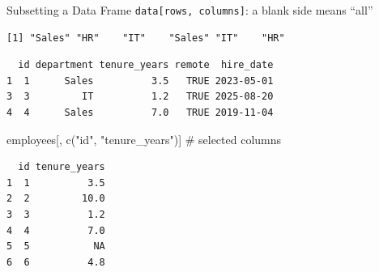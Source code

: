 \documentclass[
  ignorenonframetext,
  aspectratio=169,
]{beamer}
\newenvironment{Shaded}{\begin{snugshade}}{\end{snugshade}}
\newcommand{\CommentTok}[1]{\textcolor[rgb]{0.37,0.37,0.37}{#1}}
\newcommand{\FunctionTok}[1]{\textcolor[rgb]{0.28,0.35,0.67}{#1}}
\newcommand{\NormalTok}[1]{\textcolor[rgb]{0.00,0.23,0.31}{#1}}
\newcommand{\SpecialCharTok}[1]{\textcolor[rgb]{0.37,0.37,0.37}{#1}}
\newcommand{\StringTok}[1]{\textcolor[rgb]{0.13,0.47,0.30}{#1}}
\begin{document}
\begin{frame}[fragile]{Subsetting a Data Frame}
\protect\hypertarget{subsetting-a-data-frame}{}
\texttt{data{[}rows,\ columns{]}}: a blank side means ``all''

\begin{Shaded}
\end{Shaded}

\begin{verbatim}
[1] "Sales" "HR"    "IT"    "Sales" "IT"    "HR"   
\end{verbatim}

\begin{Shaded}
\end{Shaded}

\begin{verbatim}
  id department tenure_years remote  hire_date
1  1      Sales          3.5   TRUE 2023-05-01
3  3         IT          1.2   TRUE 2025-08-20
4  4      Sales          7.0   TRUE 2019-11-04
\end{verbatim}

\begin{Shaded}
\begin{Highlighting}[]
\NormalTok{employees[, }\FunctionTok{c}\NormalTok{(}\StringTok{"id"}\NormalTok{, }\StringTok{"tenure\_years"}\NormalTok{)]    }\CommentTok{\# selected columns}
\end{Highlighting}
\end{Shaded}

\begin{verbatim}
  id tenure_years
1  1          3.5
2  2         10.0
3  3          1.2
4  4          7.0
5  5           NA
6  6          4.8
\end{verbatim}
\end{frame}
\end{document}

